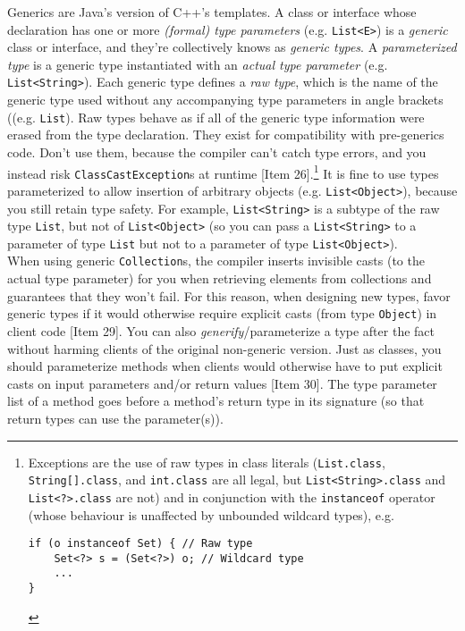 \documentclass[8pt, table, xcdraw]{article}%
\begin{document}
Generics are Java's version of C++'s templates. A class or interface whose declaration has one or more \emph{(formal) type parameters} (e.g. \lstinline{List<E>}) is a \emph{generic} class or interface, and they're collectively knows as \emph{generic types}. A \emph{parameterized type} is a generic type instantiated with an \emph{actual type parameter} (e.g. \lstinline{List<String>}). Each generic type defines a \emph{raw type}, which is the name of the generic type used without any accompanying type parameters in angle brackets ((e.g. \lstinline{List}). Raw types behave as if all of the generic type information were erased from the type declaration. They exist for compatibility with pre-generics code. Don't use them, because the compiler can't catch type errors, and you instead risk \lstinline{ClassCastException}s at runtime [Item 26].\footnote{Exceptions are the use of raw types in class literals (\lstinline{List.class}, \lstinline{String[].class}, and \lstinline{int.class} are all legal, but \lstinline{List<String>.class} and \lstinline{List<?>.class} are not) and in conjunction with the \lstinline{instanceof} operator (whose behaviour is unaffected by unbounded wildcard types), e.g.
\begin{lstlisting}
if (o instanceof Set) { // Raw type
    Set<?> s = (Set<?>) o; // Wildcard type
    ...
}
\end{lstlisting}} It is fine to use types parameterized to allow insertion of arbitrary objects (e.g. \lstinline{List<Object>}), because you still retain type safety. For example, \lstinline{List<String>} is a subtype of the raw type \lstinline{List}, but not of \lstinline{List<Object>} (so you can pass a \lstinline{List<String>} to a parameter of type \lstinline{List} but not to a parameter of type \lstinline{List<Object>}).\\
When using generic \lstinline{Collection}s, the compiler inserts invisible casts (to the actual type parameter) for you when retrieving elements from collections and guarantees that they won't fail. For this reason, when designing new types, favor generic types if it would otherwise require explicit casts (from type \lstinline{Object}) in client code [Item 29]. You can also \emph{generify}/parameterize a type after the fact without harming clients of the original non-generic version. Just as classes, you should parameterize methods when clients would otherwise have to put explicit casts on input parameters and/or return values [Item 30]. The type parameter list of a method goes before a method's return type in its signature (so that return types can use the parameter(s)).
\end{document}
